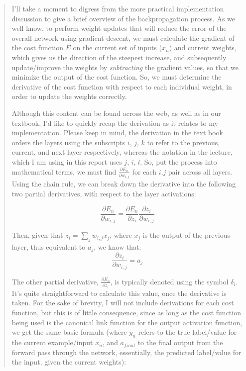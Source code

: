 \documentclass{article}
\begin{document}
\begin{quote}
 I'll take a moment to digress from the more practical implementation discussion to give a brief overview of the backpropagation process. As we well know, to perform weight updates that will reduce the error of the overall network using gradient descent, we must calculate the gradient of the cost function $E$ on the current set of inputs ($x_n$)  and current weights, which gives us the direction of the steepest increase, and subsequently update/improve the weights by \textit{subtracting} the gradient values, so that we minimize the output of the cost function. So, we must determine the derivative of the cost function with respect to each individual weight, in order to update the weights correctly. 
 
 Although this content can be found across the web, as well as in our textbook, I'd like to quickly recap the derivation as it relates to my implementation. Please keep in mind, the derivation in the text book orders the layers using the subscripts $i$, $j$, $k$ to refer to the previous, current, and next layer respectively, whereas the notation in the lecture, which I am using in this report uses $j$, $i$, $l$. So, put the process into mathematical terms, we must find $\frac{\partial E_n}{\partial w_{i,j}}$ for each $i$,$j$ pair across all layers. Using the chain rule, we can break down the derivative into the following two partial derivatives, with respect to the layer activations:
 
 $$\frac{\partial E_n}{\partial w_{i,j}} = \frac{\partial E_n}{\partial z_{i}} \frac{\partial z_{i}}{\partial  w_{i,j}}$$
 
 Then, given that $z_i = \sum_{j}^{} w_{i,j}x_j$, where $x_j$ is the output of the previous layer, thus equivalent to $a_j$, we know that:
  $$\frac{\partial z_{i}}{\partial  w_{i,j}} = a_j$$
  
  The other partial derivative, $\frac{\partial E_n}{\partial z_{i}}$, is typically denoted using the symbol $\delta_i$. It's quite straightforward to calculate this value, once the derivative is taken. For the sake of brevity, I will not include derivations for each cost function, but this is of little consequence, since as long as the cost function being used is the canonical link function for the output activation function, we get the same basic formula (where $y_n$ refers to the true label/value for the current example/input $x_n$, and $a_{final}$ to the final output from the forward pass through the network, essentially, the predicted label/value for the input, given the current weights):
  

\end{quote}
\end{document}
